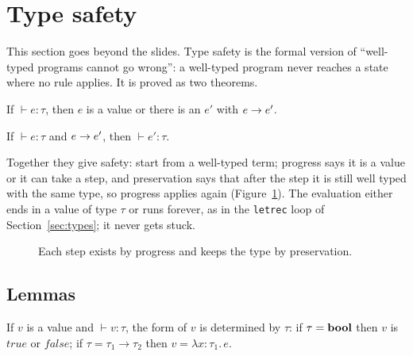 \section{Type safety}
\label{sec:safety}

This section goes beyond the slides. Type safety is the formal version of
``well-typed programs cannot go wrong'': a well-typed program never reaches a
state where no rule applies. It is proved as two theorems.

\begin{theorem}[Progress]
If $\vdash e : \tau$, then $e$ is a value or there is an $e'$ with $e \rightarrow e'$.
\end{theorem}

\begin{theorem}[Preservation]
If $\vdash e : \tau$ and $e \rightarrow e'$, then $\vdash e' : \tau$.
\end{theorem}

Together they give safety: start from a well-typed term; progress says it is a
value or it can take a step, and preservation says that after the step it is
still well typed with the same type, so progress applies again
(Figure~\ref{fig:safety}). The evaluation either ends in a value of type
$\tau$ or runs forever, as in the \texttt{letrec} loop of
Section~\ref{sec:types}; it never gets stuck.

\begin{figure}[h]
\centering
{}
\caption{Each step exists by progress and keeps the type by preservation.}
\label{fig:safety}
\end{figure}

\subsection{Lemmas}

\begin{lemma}
If $v$ is a value and $\vdash v : \tau$, the form of $v$ is determined by $\tau$:
if $\tau = \mathbf{bool}$ then $v$ is $\mathit{true}$ or $\mathit{false}$; if $\tau = \tau_1 \to \tau_2$
then $v = \lambda x{:}\tau_1.\, e$.
\end{lemma}

